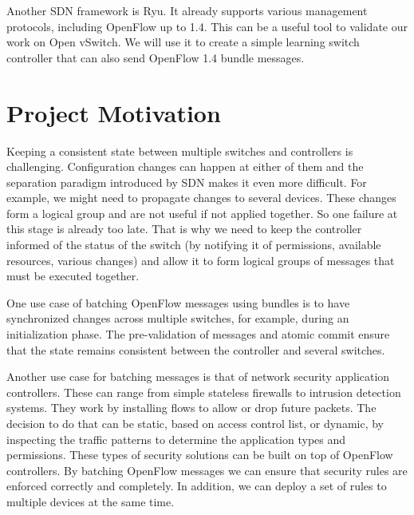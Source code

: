 Another SDN framework is Ryu\cite{ryu}. It already supports various management protocols, including OpenFlow up to 1.4.
This can be a useful tool to validate our work on Open vSwitch. We will use it to create a simple learning switch
controller that can also send OpenFlow 1.4 bundle messages.

\section{Project Motivation}

Keeping a consistent state between multiple switches and controllers is challenging. Configuration
changes can happen at either of them and the separation paradigm introduced by SDN makes it even
more difficult. For example, we might need to propagate changes to several devices. These changes form
a logical group and are not useful if not applied together. So one failure at this stage is already too
late. That is why we need to keep the controller informed of the status of the switch (by notifying it of
permissions, available resources, various changes) and allow it to form logical groups of messages that
must be executed together.

One use case of batching OpenFlow messages using bundles is to have synchronized changes across multiple switches,
for example, during an initialization phase. The pre-validation of messages and atomic commit ensure
that the state remains consistent between the controller and several switches.

Another use case for batching messages is that of network security application controllers. These can range
from simple stateless firewalls to intrusion detection systems\cite{sdn}. They work by installing flows to
allow or drop future packets. The decision to do that can be static, based on access control list, or dynamic,
by inspecting the traffic patterns to determine the application types and permissions.
These types of security solutions can be built on top of OpenFlow controllers. By batching OpenFlow
messages we can ensure that security rules are enforced correctly and completely. In addition, we can
deploy a set of rules to multiple devices at the same time.

